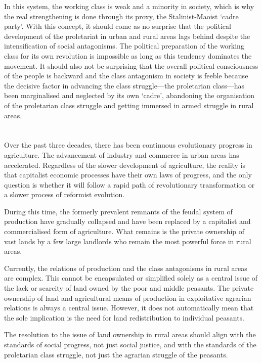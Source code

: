 In this system, the working class is weak and a minority in society, 
which is why the real strengthening is done through its proxy, 
the Stalinist-Maoist `cadre party'. 
With this concept, it should come as no surprise that the political development 
of the proletariat in urban and rural areas lags behind despite the 
intensification of social antagonisms. The political preparation of the working 
class for its own revolution is impossible as long as this tendency dominates 
the movement. 
It should also not be surprising that the overall political consciousness of the 
people is backward and the class antagonism in society is feeble because the 
decisive factor in advancing the class struggle---the proletarian class---has 
been marginalised and neglected by its own `cadre', 
abandoning the organisation of the proletarian class struggle and getting 
immersed in armed struggle in rural areas.


\section{}
Over the past three decades, 
there has been continuous evolutionary progress in agriculture. 
The advancement of industry and commerce in urban areas has accelerated.
Regardless of the slower development of agriculture, 
the reality is that capitalist economic processes have 
their own laws of progress, 
and the only question is whether it will follow a rapid path 
of revolutionary transformation or a slower process of reformist evolution.

During this time, 
the formerly prevalent remnants of the feudal system of production 
have gradually collapsed and have been replaced by a capitalist 
and commercialised form of agriculture. 
What remains is the private ownership of vast lands by a few large landlords 
who remain the most powerful force in rural areas.

Currently, the relations of production and the class antagonisms 
in rural areas are complex. 
This cannot be encapsulated or simplified solely as a central issue of 
the lack or scarcity of land owned by the poor and middle peasants. 
The private ownership of land and agricultural means of production 
in exploitative agrarian relations is always a central issue. 
However, it does not automatically mean that the sole implication 
is the need for land redistribution to individual peasants.

The resolution to the issue of land ownership in rural areas should align 
with the standards of social progress, not just social justice, 
and with the standards of the proletarian class struggle, 
not just the agrarian struggle of the peasants.

